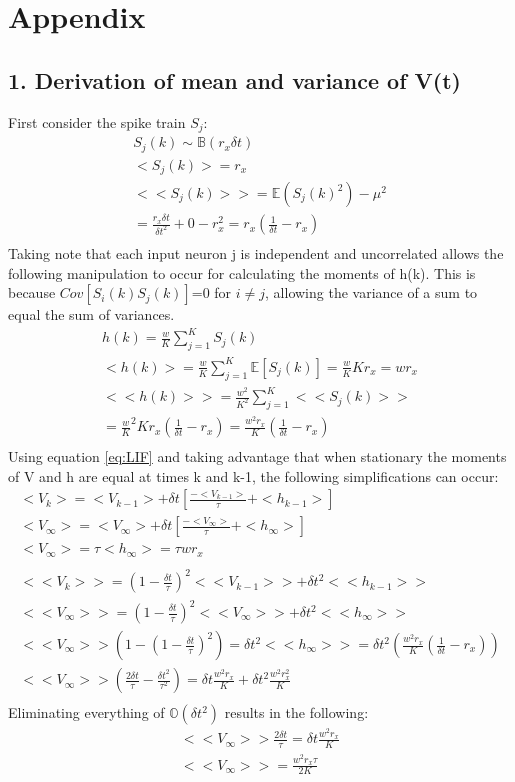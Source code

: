 \documentclass[twoside,twocolumn]{article}
\begin{document}
\onecolumn
\section{Appendix}

\subsection{1. Derivation of mean and variance of V(t)}
First consider the spike train $S_j$:
\begin{gather}
S_j(k) \sim \mathbb{B}(r_x\delta t) \nonumber \\
<S_j(k)> = r_x \nonumber \\
<<S_j(k)>> = \mathbb{E}(S_j(k)^2) - \mu^2 \nonumber\\
= \frac{r_x\delta t}{\delta t^2} + 0 -r_x^2 = r_x(\frac{1}{\delta t} - r_x)\nonumber\\
\end{gather}
Taking note that each input neuron j is independent and uncorrelated allows the following manipulation to occur for calculating the moments of h(k). This is because $Cov[S_i(k)S_j(k)]$=0 for $i\neq j$, allowing the variance of a sum to equal the sum of variances.
\begin{gather}
h(k) = \frac{w}{K}\sum_{j=1}^KS_j(k)\nonumber\\
<h(k)> =\frac{w}{K}\sum_{j=1}^K \mathbb{E}[S_j(k)] = \frac{w}{K} Kr_x = wr_x \nonumber\\
<<h(k)>> = \frac{w^2}{K^2}   \sum_{j=1}^K  <<S_j(k)>>\nonumber \\
= \frac{w}{K}^2   K  r_x(\frac{1}{\delta t} - r_x)  = \frac{w^2r_x}{K} (\frac{1}{\delta t} - r_x)\nonumber\\
\end{gather}
Using equation \ref{eq:LIF} and taking advantage that when stationary the moments of V and h are equal at times k and k-1, the following simplifications can occur:
\begin{gather}
<V_k> = <V_{k-1}> + \delta t [ \frac{-<V_{k-1}>}{\tau} + <h_{k-1}>]\nonumber\\
<V_{\infty}> = <V_{\infty}> + \delta t [ \frac{-<V_{\infty}>}{\tau} + <h_{\infty}>]\nonumber\\
<V_{\infty}> = \tau <h_{\infty}> = \tau wr_x \nonumber\\ 
\nonumber\\
<<V_k>> =(1-\frac{\delta t }{\tau})^2 <<V_{k-1}>> + \delta t^2<<h_{k-1}>>\nonumber\\
<<V_{\infty}>> =(1-\frac{\delta t }{\tau})^2 <<V_{\infty}>> + \delta t^2<<h_{\infty}>>\nonumber\\
<<V_{\infty}>>(1-(1-\frac{\delta t }{\tau})^2) = \delta t^2 <<h_{\infty}>> = \delta t^2(\frac{w^2r_x}{K} (\frac{1}{\delta t} - r_x) ) \nonumber\\
<<V_{\infty}>>(\frac{2\delta t}{\tau} - \frac{\delta t^2}{\tau^2}) = \delta t\frac{w^2r_x}{K} + \delta t^2 \frac{w^2r_x^2}{K}\nonumber \\
\end{gather}
Eliminating everything of $\mathbb{O}(\delta t^2)$ results in the following:
\begin{gather}
<<V_{\infty}>>\frac{2\delta t}{\tau} = \delta t\frac{w^2r_x}{K}\nonumber \\
<<V_{\infty}>> = \frac{w^2r_x\tau}{2K} \nonumber \\
\end{gather}

\end{document}
